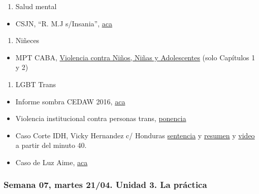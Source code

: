 \documentclass[
]{article}
\providecommand{\tightlist}{%
  \setlength{\itemsep}{0pt}\setlength{\parskip}{0pt}}
\begin{document}
\begin{enumerate}
\def\labelenumi{\alph{enumi}.}
\setcounter{enumi}{3}
\tightlist
\item
  Salud mental
\end{enumerate}

\begin{itemize}
\tightlist
\item
  CSJN, ``R. M.J s/Insania'',
  \href{https://drive.google.com/file/d/1c29zw3cQDmwNGuO-GDR15KUq7Xc-UZJb/view?usp=sharing}{aca}
\end{itemize}

\begin{enumerate}
\def\labelenumi{\alph{enumi}.}
\setcounter{enumi}{4}
\tightlist
\item
  Niñeces
\end{enumerate}

\begin{itemize}
\tightlist
\item
  MPT CABA,
  \href{https://drive.google.com/file/d/1lc3H955K8Wx1-7mdtDAJX--CBBcqXfuX/view?usp=sharing}{Violencia
  contra Niños, Niñas y Adolescentes} (solo Capítulos 1 y 2)
\end{itemize}

\begin{enumerate}
\def\labelenumi{\alph{enumi}.}
\setcounter{enumi}{3}
\tightlist
\item
  LGBT Trans
\end{enumerate}

\begin{itemize}
\item
  Informe sombra CEDAW 2016,
  \href{https://drive.google.com/file/d/1Zv0TtTTzgt5N4vSBEo3F7UjiayBQ2BIx/view?usp=sharing}{aca}
\item
  Violencia institucional contra personas trans,
  \href{https://drive.google.com/file/d/1NWDuVTHVpSSWbHTuvP6WPAy6waXvDyXo/view}{ponencia}
\item
  Caso Corte IDH, Vicky Hernandez c/ Honduras
  \href{https://www.corteidh.or.cr/docs/casos/articulos/seriec_422_esp.pdf}{sentencia}
  y
  \href{https://www.corteidh.or.cr/docs/casos/articulos/resumen_422_esp.pdf}{resumen}
  y \href{https://www.youtube.com/watch?v=5AXht8vR6l8}{video} a partir
  del minuto 40.
\item
  Caso de Luz Aime,
  \href{https://www.cosecharoja.org/absolucion-para-luz-le-quieren-dar-perpetua-por-trans-y-pobre/}{aca}
\end{itemize}

\subsubsection{Semana 07, martes 21/04. Unidad 3. La
práctica}\label{semana-07-martes-2104.-unidad-3.-la-pruxe1ctica}
\end{document}
